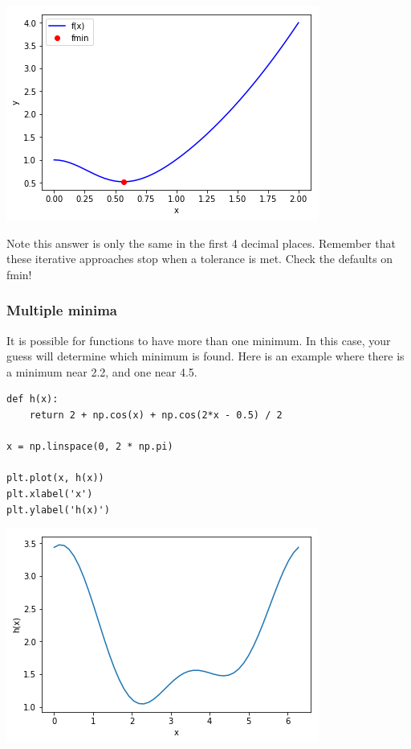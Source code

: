 \documentclass[11pt]{article}
\begin{document}
\begin{center}
\includegraphics[width=.9\linewidth]{obipy-resources/baab0982fed766ced9ac305dd57e067d-90490HHI.png}
\end{center}

Note this answer is only the same in the first 4 decimal places. Remember that these iterative approaches stop when a tolerance is met. Check the defaults on fmin!

\subsubsection{Multiple minima}
\label{sec:orgc8f8507}

It is possible for functions to have more than one minimum. In this case, your guess will determine which minimum is found. Here is an example where there is a minimum near 2.2, and one near 4.5.

\begin{verbatim}
def h(x):
    return 2 + np.cos(x) + np.cos(2*x - 0.5) / 2

x = np.linspace(0, 2 * np.pi)

plt.plot(x, h(x))
plt.xlabel('x')
plt.ylabel('h(x)')
\end{verbatim}

\begin{center}
\includegraphics[width=.9\linewidth]{obipy-resources/baab0982fed766ced9ac305dd57e067d-90490hbU.png}
\end{center}
\end{document}
